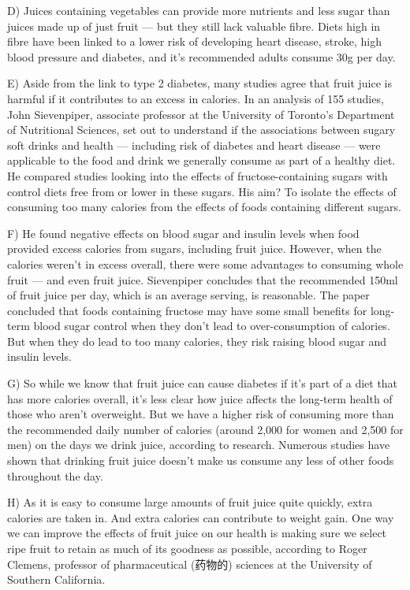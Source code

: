 \documentclass[UTF8,11pt]{ctexart}
\begin{document}
D) Juices containing vegetables can provide more nutrients and less sugar than juices made up of just fruit — but they still lack valuable fibre. Diets high in fibre have been linked to a lower risk of developing heart disease, stroke, high blood pressure and diabetes, and it’s recommended adults consume 30g per day.


E) Aside from the link to type 2 diabetes, many studies agree that fruit juice is harmful if it contributes to an excess in calories. In an analysis of 155 studies, John Sievenpiper, associate professor at the University of Toronto’s Department of Nutritional Sciences, set out to understand if the associations between sugary soft drinks and health — including risk of diabetes and heart disease — were applicable to the food and drink we generally consume as part of a healthy diet. He compared studies looking into the effects of fructose-containing sugars with control diets free from or lower in these sugars. His aim? To isolate the effects of consuming too many calories from the effects of foods containing different sugars.


F) He found negative effects on blood sugar and insulin levels when food provided excess calories from sugars, including fruit juice. However, when the calories weren’t in excess overall, there were some advantages to consuming whole fruit — and even fruit juice. Sievenpiper concludes that the recommended 150ml of fruit juice per day, which is an average serving, is reasonable. The paper concluded that foods containing fructose may have some small benefits for long-term blood sugar control when they don’t lead to over-consumption of calories. But when they do lead to too many calories, they risk raising blood sugar and insulin levels.


G) So while we know that fruit juice can cause diabetes if it’s part of a diet that has more calories overall, it’s less clear how juice affects the long-term health of those who aren’t overweight. But we have a higher risk of consuming more than the recommended daily number of calories (around 2,000 for women and 2,500 for men) on the days we drink juice, according to research. Numerous studies have shown that drinking fruit juice doesn’t make us consume any less of other foods throughout the day.


H) As it is easy to consume large amounts of fruit juice quite quickly, extra calories are taken in. And extra calories can contribute to weight gain. One way we can improve the effects of fruit juice on our health is making sure we select ripe fruit to retain as much of its goodness as possible, according to Roger Clemens, professor of pharmaceutical (药物的) sciences at the University of Southern California.
\end{document}

